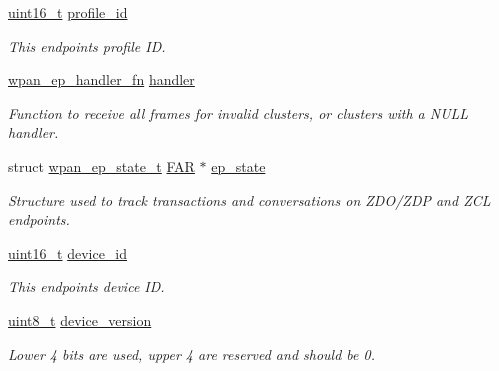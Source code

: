 \begin{DoxyCompactItemize}
\hyperlink{group__hal__dos_ga5a8b2dc9e45a9ee81a94ef304fb62505}{uint16\+\_\+t} \hyperlink{group__wpan__aps_ga5ca7f19e5697de2baf0e2147a41a5792}{profile\+\_\+id}
\begin{DoxyCompactList}\small\item\em This endpoint\textquotesingle{}s profile ID. \end{DoxyCompactList}\item 
\hyperlink{group__wpan__aps_ga23d4e0e2f2137c75700dfec73b2cc80f}{wpan\+\_\+ep\+\_\+handler\+\_\+fn} \hyperlink{group__wpan__aps_ga4835da0b636ce07eedbf92aa2779a761}{handler}
\begin{DoxyCompactList}\small\item\em Function to receive all frames for invalid clusters, or clusters with a {\ttfamily N\+U\+LL} handler. \end{DoxyCompactList}\item 
struct \hyperlink{structwpan__ep__state__t}{wpan\+\_\+ep\+\_\+state\+\_\+t} \hyperlink{group__hal_gaef060b3456fdcc093a7210a762d5f2ed}{F\+AR} $\ast$ \hyperlink{group__wpan__aps_ga389966cb276b33004b14ee698c270347}{ep\+\_\+state}
\begin{DoxyCompactList}\small\item\em Structure used to track transactions and conversations on Z\+D\+O/\+Z\+DP and Z\+CL endpoints. \end{DoxyCompactList}\item 
\mbox{\label{group__wpan__aps_gadc401e0e7465eda38f9444eeb6169a10}} 
\hyperlink{group__hal__dos_ga5a8b2dc9e45a9ee81a94ef304fb62505}{uint16\+\_\+t} \hyperlink{group__wpan__aps_gadc401e0e7465eda38f9444eeb6169a10}{device\+\_\+id}
\begin{DoxyCompactList}\small\item\em This endpoint\textquotesingle{}s device ID. \end{DoxyCompactList}\item 
\mbox{\label{group__wpan__aps_ga0b8f4e315b56b3e3c53dea801ce92104}} 
\hyperlink{group__hal__dos_gae1affc9ca37cfb624959c866a73f83c2}{uint8\+\_\+t} \hyperlink{group__wpan__aps_ga0b8f4e315b56b3e3c53dea801ce92104}{device\+\_\+version}
\begin{DoxyCompactList}\small\item\em Lower 4 bits are used, upper 4 are reserved and should be 0. \end{DoxyCompactList}\item 

\end{DoxyCompactItemize}
